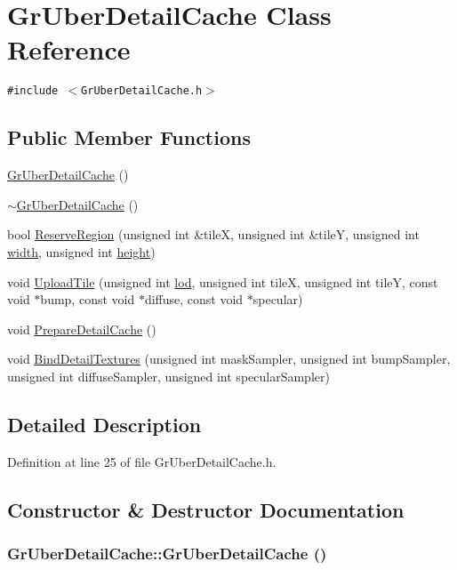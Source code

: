 \hypertarget{class_gr_uber_detail_cache}{
\section{GrUberDetailCache Class Reference}
\label{class_gr_uber_detail_cache}
}
{\tt \#include $<$GrUberDetailCache.h$>$}

\subsection*{Public Member Functions}
\begin{CompactItemize}
\item 
\hyperlink{class_gr_uber_detail_cache_1e3f165c71882d50f811e16a4a0da03c}{GrUberDetailCache} ()
\item 
\hyperlink{class_gr_uber_detail_cache_cc67d35e05435f6a2472025b82022196}{$\sim$GrUberDetailCache} ()
\item 
bool \hyperlink{class_gr_uber_detail_cache_68e9bc8e181ee380c287e4c0c4a4ad41}{ReserveRegion} (unsigned int \&tileX, unsigned int \&tileY, unsigned int \hyperlink{wglext_8h_e6531b1788ca42a9ae8155b0c52e7630}{width}, unsigned int \hyperlink{wglext_8h_b2e63df950c3789599e1e43f477bc9e3}{height})
\item 
void \hyperlink{class_gr_uber_detail_cache_85a556efeacb9a9b2e9b2eb74bded94c}{UploadTile} (unsigned int \hyperlink{glext_8h_5b5a34b88a28ab9c203c2b432f6168b6}{lod}, unsigned int tileX, unsigned int tileY, const void $\ast$bump, const void $\ast$diffuse, const void $\ast$specular)
\item 
void \hyperlink{class_gr_uber_detail_cache_8c57ef3013e8de891cc64d633f033a26}{PrepareDetailCache} ()
\item 
void \hyperlink{class_gr_uber_detail_cache_09b761a56435b280523c0e0ce601bbe2}{BindDetailTextures} (unsigned int maskSampler, unsigned int bumpSampler, unsigned int diffuseSampler, unsigned int specularSampler)
\end{CompactItemize}


\subsection{Detailed Description}


Definition at line 25 of file GrUberDetailCache.h.

\subsection{Constructor \& Destructor Documentation}
\hypertarget{class_gr_uber_detail_cache_1e3f165c71882d50f811e16a4a0da03c}{
\subsubsection[{GrUberDetailCache}]{\setlength{\rightskip}{0pt plus 5cm}GrUberDetailCache::GrUberDetailCache ()}}
\label{class_gr_uber_detail_cache_1e3f165c71882d50f811e16a4a0da03c}




